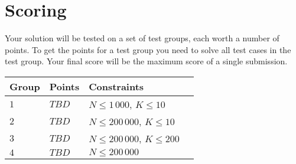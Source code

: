 \section*{Scoring}
Your solution will be tested on a set of test groups, each worth a number of points.
To get the points for a test group you need to solve all test cases in the test group.
Your final score will be the maximum score of a single submission.

\noindent
\begin{tabular}{| l | l | l | l |}
\hline
Group & Points & Constraints \\ \hline
$1$    & $TBD$         & $N \le 1\,000$, $K \le 10$ \\ \hline
$2$    & $TBD$         & $N \le 200\,000$, $K \le 10$ \\ \hline
$3$    & $TBD$         & $N \le 200\,000$, $K \le 200$ \\ \hline
$4$    & $TBD$         & $N \le 200\,000$ \\ \hline
\end{tabular}
